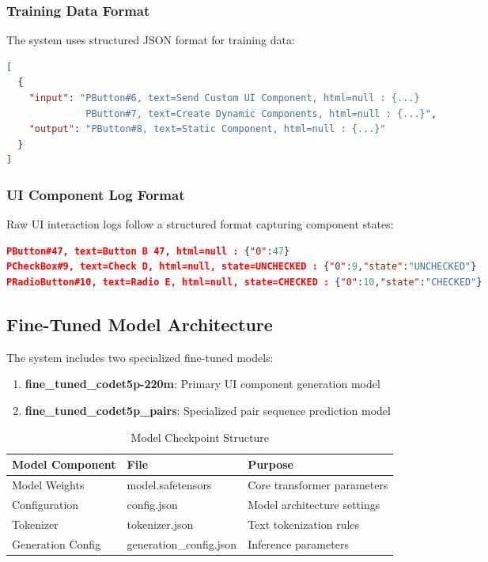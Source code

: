 \documentclass[12pt,a4paper]{article}
\begin{document}
\subsubsection{Training Data Format}

The system uses structured JSON format for training data:

\begin{lstlisting}[caption=Training Pair Data Structure, language=JSON]
[
  {
    "input": "PButton#6, text=Send Custom UI Component, html=null : {...}
              PButton#7, text=Create Dynamic Components, html=null : {...}",
    "output": "PButton#8, text=Static Component, html=null : {...}"
  }
]
\end{lstlisting}

\subsubsection{UI Component Log Format}

Raw UI interaction logs follow a structured format capturing component states:

\begin{lstlisting}[caption=UI Component Log Structure, language=JSON]
PButton#47, text=Button B 47, html=null : {"0":47}
PCheckBox#9, text=Check D, html=null, state=UNCHECKED : {"0":9,"state":"UNCHECKED"}
PRadioButton#10, text=Radio E, html=null, state=CHECKED : {"0":10,"state":"CHECKED"}
\end{lstlisting}

\subsection{Fine-Tuned Model Architecture}

The system includes two specialized fine-tuned models:

\begin{enumerate}
    \item \textbf{fine\_tuned\_codet5p-220m}: Primary UI component generation model
    \item \textbf{fine\_tuned\_codet5p\_pairs}: Specialized pair sequence prediction model
\end{enumerate}

\begin{table}[H]
\centering
\begin{tabular}{|l|l|l|}
\hline
\textbf{Model Component} & \textbf{File} & \textbf{Purpose} \\
\hline
Model Weights & model.safetensors & Core transformer parameters \\
Configuration & config.json & Model architecture settings \\
Tokenizer & tokenizer.json & Text tokenization rules \\
Generation Config & generation\_config.json & Inference parameters \\
\hline
\end{tabular}
\caption{Model Checkpoint Structure}
\label{tab:model-structure}
\end{table}
\end{document}

